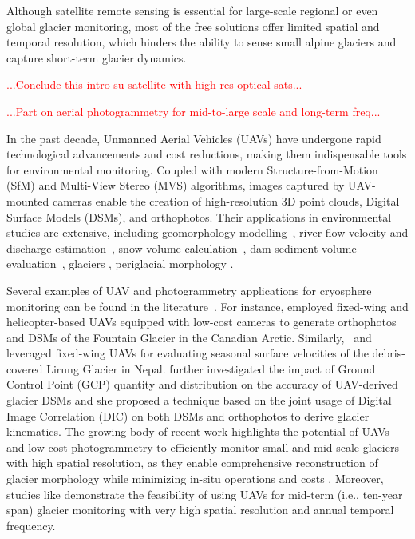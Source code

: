 Although satellite remote sensing is essential for large-scale regional or even global glacier monitoring, most of the free solutions offer limited spatial and temporal resolution, which hinders the ability to sense small alpine glaciers and capture short-term glacier dynamics. 

\textcolor{red}{...Conclude this intro su satellite with high-res optical sats...}

\textcolor{red}{...Part on aerial photogrammetry for mid-to-large scale and long-term freq...}

In the past decade, Unmanned Aerial Vehicles (UAVs) have undergone rapid technological advancements and cost reductions,
making them indispensable tools for environmental monitoring. 
Coupled with modern Structure-from-Motion (SfM) \citep{Westoby2012} and Multi-View Stereo (MVS) \citep{Seitz2006} algorithms, 
images captured by UAV-mounted cameras enable the creation of high-resolution 3D point clouds, Digital Surface Models (DSMs),
and orthophotos. 
Their applications in environmental studies are extensive, including geomorphology modelling~\citep{Cook2017, James2017_3duncertainty}, 
river flow velocity and discharge estimation~\citep{Detert2017,Ioli2020}, 
snow volume calculation~\citep{DeMichele2016, Buhler2016, Avanzi2018},
dam sediment volume evaluation~\citep{Pagliari2016}, glaciers \citep{Immerzeel2014, Chudley2019, Groos2019}, 
periglacial morphology \citep{Sledz2021}.

Several examples of UAV and photogrammetry applications for cryosphere monitoring can be found in the literature~\citep{Bhardwaj2016, Gaffey2020}.
For instance, \cite{Whitehead2013} employed fixed-wing and helicopter-based UAVs equipped with low-cost cameras to generate orthophotos 
and DSMs of the Fountain Glacier in the Canadian Arctic. 
Similarly,~\cite{Immerzeel2014} and \cite{kraaijenbrink2016} leveraged fixed-wing UAVs for evaluating seasonal surface velocities of the debris-covered
Lirung Glacier in Nepal. 
\cite{Gindraux2017} further investigated the impact of Ground Control Point (GCP) quantity and distribution on the accuracy of UAV-derived glacier DSMs 
and she proposed a technique based on the joint usage of Digital Image Correlation (DIC) on both DSMs and orthophotos to derive glacier kinematics.
The growing body of recent work highlights the potential of UAVs and low-cost photogrammetry to efficiently monitor small and mid-scale 
glaciers with high spatial resolution, as they enable comprehensive reconstruction of glacier morphology while minimizing in-situ operations and
costs \citep{Benoit2019, Chudley2019, Jouvet2020, Cao2021, Lamsters2022, belloni2023}.
Moreover, studies like \cite{ioli2021mid} demonstrate the feasibility of using UAVs for mid-term (i.e., ten-year span) glacier monitoring with 
very high spatial resolution and annual temporal frequency.
 
